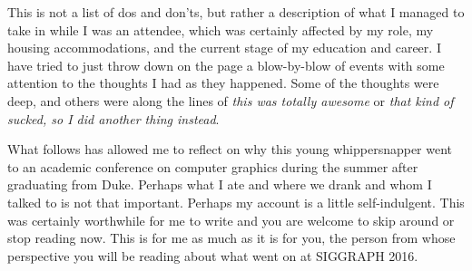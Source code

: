 \documentclass[a4paper, 11pt]{article} %
\begin{document}
This is not a list of dos and don'ts, but rather a description of what I managed to take in while I was an attendee, which was certainly affected by my role, my housing accommodations, and the current stage of my education and career. I have tried to just throw down on the page a blow-by-blow of events with some attention to the thoughts I had as they happened. Some of the thoughts were deep, and others were along the lines of \textit{this was totally awesome} or \textit{that kind of sucked, so I did another thing instead}.

What follows has allowed me to reflect on why this young whippersnapper went to an academic conference on computer graphics during the summer after graduating from Duke. Perhaps what I ate and where we drank and whom I talked to is not that important. Perhaps my account is a little self-indulgent. This was certainly worthwhile for me to write and you are welcome to skip around or stop reading now. This is for me as much as it is for you, the person from whose perspective you will be reading about what went on at SIGGRAPH 2016.

\eject

\tableofcontents

\eject



\newpage



\newpage



\newpage



\newpage



\newpage



\newpage



\newpage



\newpage




%


%

\end{document}
